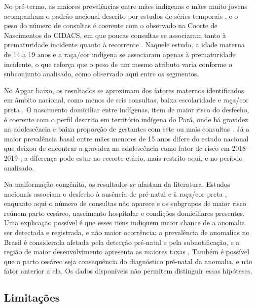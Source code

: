 No pré-termo, as maiores prevalências entre mães indígenas e mães muito jovens acompanham o padrão nacional descrito por estudos de séries temporais \cite{alberton2023,victor2025}, e o peso do número de consultas é coerente com o observado na Coorte de Nascimentos do CIDACS, em que poucas consultas se associaram tanto à prematuridade incidente quanto à recorrente \cite{rocha2022}. Naquele estudo, a idade materna de 14 a 19 anos e a raça/cor indígena se associaram apenas à prematuridade incidente, o que reforça que o peso de um mesmo atributo varia conforme o subconjunto analisado, como observado aqui entre os segmentos.

No Apgar baixo, os resultados se aproximam dos fatores maternos identificados em âmbito nacional, como menos de seis consultas, baixa escolaridade e raça/cor preta \cite{magalhaes2023}. O nascimento domiciliar entre indígenas, item de maior risco do desfecho, é coerente com o perfil descrito em território indígena do Pará, onde há gravidez na adolescência e baixa proporção de gestantes com sete ou mais consultas \cite{lima2025}. Já a maior prevalência basal entre mães menores de 15 anos difere do estudo nacional que deixou de encontrar a gravidez na adolescência como fator de risco em 2018--2019 \cite{magalhaes2023}; a diferença pode estar no recorte etário, mais restrito aqui, e no período analisado.

Na malformação congênita, os resultados se afastam da literatura. Estudos nacionais associam o desfecho à ausência de pré-natal e à raça/cor preta \cite{fernandes2025,trevilato2022}, enquanto aqui o número de consultas não aparece e os subgrupos de maior risco reúnem parto cesáreo, nascimento hospitalar e condições domiciliares presentes. Uma explicação possível é que esses itens indiquem maior chance de a anomalia ser detectada e registrada, e não maior ocorrência: a prevalência de anomalias no Brasil é considerada afetada pela detecção pré-natal e pela subnotificação, e a região de maior desenvolvimento apresenta as maiores taxas \cite{melkan2025}. Também é possível que o parto cesáreo seja consequência do diagnóstico pré-natal da anomalia, e não fator anterior a ela. Os dados disponíveis não permitem distinguir essas hipóteses.

\subsection{Limitações}\label{subsec:disc-limitacoes}

